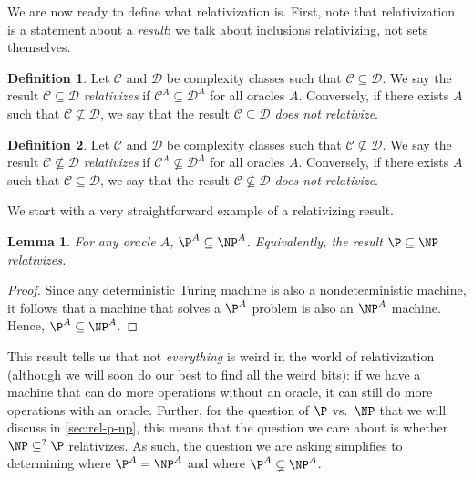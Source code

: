 \documentclass[english,12pt]{reedthesis}
\theoremstyle{plain}
\newtheorem{lemma}[lemma]{Lemma}
\theoremstyle{definition}
\newtheorem{defn}[defn]{Definition}
\theoremstyle{remark}
\begin{document}
We are now ready to define what relativization is. First, note that
relativization is a statement about a \emph{result}: we talk about inclusions
relativizing, not sets themselves.

\begin{defn}\label{def:relativization}
  Let $\mathcal{C}$ and $\mathcal{D}$ be complexity classes such that $\mathcal{C} \subseteq \mathcal{D}$. We say the result
  $\mathcal{C} \subseteq \mathcal{D}$ \emph{relativizes} if $\mathcal{C}^{A} \subseteq \mathcal{D}^{A}$ for all oracles $A$. Conversely,
  if there exists $A$ such that $\mathcal{C} \nsubseteq \mathcal{D}$, we say that the result $\mathcal{C} \subseteq \mathcal{D}$
  \emph{does not relativize}.
\end{defn}

\begin{defn}\label{def:relativization-ne}
  Let $\mathcal{C}$ and $\mathcal{D}$ be complexity classes such that $\mathcal{C} \nsubseteq \mathcal{D}$. We say the result
  $\mathcal{C} \nsubseteq \mathcal{D}$ \emph{relativizes} if $\mathcal{C}^{A} \nsubseteq \mathcal{D}^{A}$ for all oracles $A$. Conversely,
  if there exists $A$ such that $\mathcal{C} \subseteq \mathcal{D}$, we say that the result $\mathcal{C} \nsubseteq \mathcal{D}$
  \emph{does not relativize}.
\end{defn}

We start with a very straightforward example of a relativizing result.

\begin{lemma}\label{lem:pa-subset-npa}
  For any oracle $A$, $\P^{A} \subseteq \NP^{A}$. Equivalently, the result $\P \subseteq \NP$
  relativizes.
\end{lemma}

\begin{proof}
  Since any deterministic Turing machine is also a nondeterministic machine, it
  follows that a machine that solves a $\P^{A}$ problem is also an $\NP^{A}$
  machine. Hence, $\P^{A} \subseteq \NP^{A}$.
\end{proof}

This result tells us that not \emph{everything} is weird in the world of
relativization (although we will soon do our best to find all the weird bits):
if we have a machine that can do more operations without an oracle, it can still
do more operations with an oracle. Further, for the question of $\P$ vs.\ $\NP$
that we will discuss in \cref{sec:rel-p-np}, this means that the question we
care about is whether $\NP \subseteq^{?} \P$ relativizes. As such, the question we are
asking simplifies to determining where $\P^{A} = \NP^{A}$ and where
$\P^{A} \subsetneq \NP^{A}$.
\end{document}
